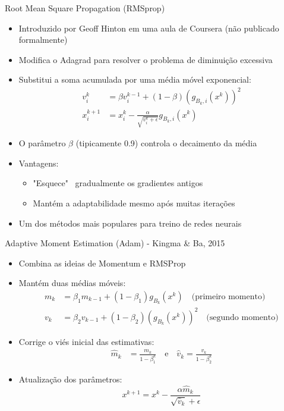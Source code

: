 \documentclass[aspectratio=1610]{beamer}
\begin{document}
\begin{frame}{Root Mean Square Propagation (RMSprop)}
\begin{itemize}
    \item Introduzido por Geoff Hinton em uma aula de Coursera (não publicado
formalmente)
    \item Modifica o Adagrad para resolver o problema de diminuição excessiva \pause
    \item Substitui a soma acumulada por uma média móvel exponencial: \pause
    \begin{align*}
        v_i^k &= \beta v_i^{k-1} + (1-\beta) (g_{B_k,i}(x^k))^2 \\
        x_i^{k+1} &= x_i^k - \frac{\alpha}{\sqrt{v_i^k + \epsilon}} g_{B_k,i}(x^k)
    \end{align*} \pause
    \item O parâmetro $\beta$ (tipicamente 0.9) controla o decaimento da média \pause
    \item Vantagens: \pause
    \begin{itemize}
        \item "Esquece"~ gradualmente os gradientes antigos \pause
        \item Mantém a adaptabilidade mesmo após muitas iterações \pause
    \end{itemize} \pause
    \item Um dos métodos mais populares para treino de redes neurais
\end{itemize}
\end{frame}

\begin{frame}{Adaptive Moment Estimation (Adam) - Kingma \& Ba, 2015}
\begin{itemize}
    \item Combina as ideias de Momentum e RMSProp \pause
    \item Mantém duas médias móveis:
    \begin{align*}
        m_k &= \beta_1 m_{k-1} + (1 - \beta_1) g_{B_k}(x^k) \quad \text{(primeiro momento)} \\
        v_k &= \beta_2 v_{k-1} + (1 - \beta_2) (g_{B_k}(x^k))^2 \quad \text{(segundo momento)}
    \end{align*} \pause
    \item Corrige o viés inicial das estimativas:
    \begin{align*}
        \hat{m}_k &= \frac{m_k}{1 - \beta_1^k} \quad \text{e} \quad \hat{v}_k = \frac{v_k}{1 - \beta_2^k}
    \end{align*} \pause
    \item Atualização dos parâmetros:
    \begin{equation*}
        x^{k+1} = x^k - \frac{\alpha \hat{m}_k}{\sqrt{\hat{v}_k} + \epsilon}
    \end{equation*}
\end{itemize}
\end{frame}
\end{document}

